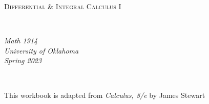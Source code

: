 \documentclass[notes]{subfiles}
\begin{document}
\rhead{}
\lhead{}
\chead{}
\thispagestyle{empty}
\[\]
\vspace{1in}
\begin{center}
	\begin{Huge}
		\textsc{Differential \& Integral Calculus I}
	\end{Huge}\\
		\vspace{2in}
	\begin{Large}
		\emph{Math 1914}\\
		\emph{University of Oklahoma}\\
		\emph{Spring 2023}
	\end{Large}\\
\end{center}
\vspace{2in}
\begin{center}
	This workbook is adapted from \emph{Calculus, 8/e} by James Stewart
\end{center}
\newpage
\thispagestyle{empty}
	\[\]
\end{document}
